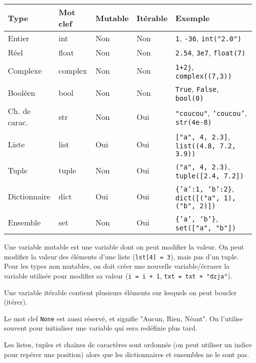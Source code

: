 \documentclass{article}
\begin{document}
\begin{tabular}{|l|l|l|l|l|}
    \hline
    Type                    & Mot clef  & Mutable   & Itérable  & Exemple\\
    \hline
    Entier                  & int       & Non       & Non       & \texttt{1}, \texttt{-36}, \texttt{int("2.0")}\\
    Réel                    & float     & Non       & Non       & \texttt{2.54}, \texttt{3e7}, \texttt{float(7)}\\
    Complexe                & complex   & Non       & Non       & \texttt{1+2j}, \texttt{complex((7,3))}\\
    Booléen                 & bool      & Non       & Non       & \texttt{True}, \texttt{False}, \texttt{bool(0)}\\
    Ch. de carac.           & str       & Non       & Oui       & \texttt{"coucou"}, \texttt{'coucou'}, \texttt{str(4e-8)}\\
    Liste                   & list      & Oui       & Oui       & \texttt{["a", 4, 2.3]}, \texttt{list((4.8, 7.2, 3.9))}\\
    Tuple                   & tuple     & Non       & Oui       & \texttt{("a", 4, 2.3)}, \texttt{tuple([2.4, 7.2])}\\
    Dictionnaire            & dict      & Oui       & Oui       & \texttt{\{'a':1, 'b':2\}}, \texttt{dict([("a", 1),("b", 2)])}\\
    Ensemble                & set       & Non       & Oui       & \texttt{\{'a', 'b'\}}, \texttt{set(["a", "b"])}\\
    \hline
\end{tabular}

Une variable mutable est une variable dont on peut modifier la valeur. On peut modifier la valeur des éléments d'une liste (\texttt{lst[4] = 3}), mais pas d'un tuple. Pour les types non mutables, on doit créer une nouvelle variable/écraser la variable utilisée pour modifier sa valeur (\texttt{i = i + 1}, \texttt{txt = txt + "dzja"}).

Une variable itérable contient plusieurs éléments sur lesquels on peut boucler (itérer).

Le mot clef \texttt{None} est aussi réservé, et signifie "Aucun, Rien, Néant". On l'utilise souvent pour initialiser une variable qui sera redéfinie plus tard.

Les listes, tuples et chaînes de caractères sont ordonnés (on peut utiliser un indice pour repérer une position) alors que les dictionnaires et ensembles ne le sont pas.
\end{document}

